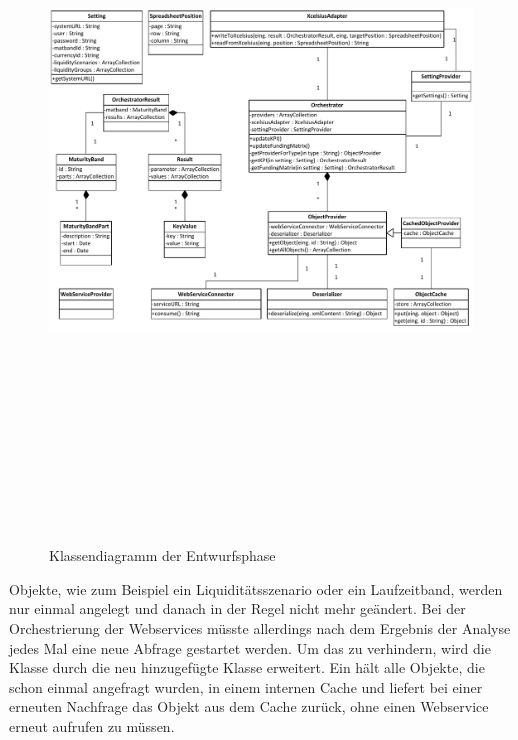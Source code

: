 \begin{onehalfspacing}
\begin{figure}[!ht]
\centering
\setlength{\unitlength}{1mm}
\includegraphics[angle=90,height=197mm]{Visio/Entwurf.pdf}
\caption{Klassendiagramm der Entwurfsphase\label{fig:klassendiagramm_entwurf}}
\end{figure}

Objekte, wie zum Beispiel ein Liquiditätsszenario oder ein Laufzeitband, werden nur einmal angelegt und danach in der Regel nicht mehr geändert. Bei der Orchestrierung der Webservices müsste allerdings nach dem Ergebnis der Analyse jedes Mal eine neue Abfrage gestartet werden. Um das zu verhindern, wird die Klasse  durch die neu hinzugefügte Klasse  erweitert. Ein  hält alle Objekte, die schon einmal angefragt wurden, in einem internen Cache und liefert bei einer erneuten Nachfrage das Objekt aus dem Cache zurück, ohne einen Webservice erneut aufrufen zu müssen.


\end{onehalfspacing}
